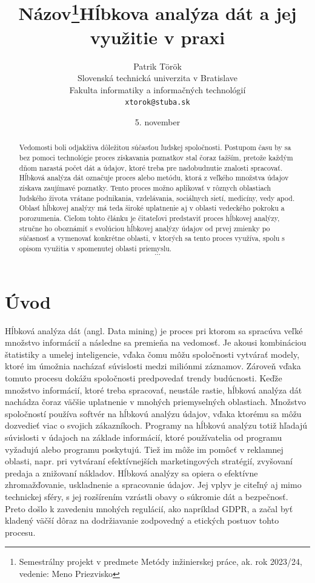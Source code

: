 \documentclass[10pt,twoside,slovak,a4paper]{article}
\title{Názov\thanks{Semestrálny projekt v predmete Metódy inžinierskej práce, ak. rok 2023/24, vedenie: Meno Priezvisko}} %
\title{Hĺbkova analýza dát a jej využitie v praxi}
\author{Patrik Török\\[2pt]
	{\small Slovenská technická univerzita v Bratislave}\\
	{\small Fakulta informatiky a informačných technológií}\\
	{\small \texttt{xtorok@stuba.sk}}
	}
\date{\small 5. november } %
\begin{document}
\maketitle

\begin{abstract}
Vedomosti boli odjakživa dôležitou súčasťou ľudskej spoločnosti. Postupom času by sa bez pomoci technológie proces získavania poznatkov stal čoraz ťažším, pretože každým dňom narastá počet dát a údajov, ktoré treba pre nadobudnutie znalosti spracovať. Hĺbková analýza dát označuje proces alebo metódu, ktorá z veľkého množstva údajov získava zaujímavé poznatky. Tento proces možno aplikovať v rôznych oblastiach ľudského života vrátane podnikania, vzdelávania, sociálnych sietí, medicíny, vedy apod. Oblasť hĺbkovej analýzy má teda široké uplatnenie aj v oblasti vedeckého pokroku a porozumenia. Cieľom tohto článku je čitateľovi predstaviť proces hĺbkovej analýzy, stručne ho oboznámiť s evolúciou hĺbkovej analýzy údajov od prvej zmienky po súčasnosť a vymenovať konkrétne oblasti, v ktorých sa tento proces využíva, spolu s opisom využitia v spomenutej oblasti priemyslu. 
$$ \cdots $$
\end{abstract}



\section{Úvod}
Hĺbková analýza dát (angl. Data mining) je proces pri ktorom sa spracúva veľké množstvo informácií a následne sa premieňa na vedomosť\cite{Iberdola}. Je akousi kombináciou štatistiky a umelej inteligencie, vďaka čomu môžu spoločnosti vytvárať modely, ktoré im úmožnia nacházať súvislosti medzi miliónmi záznamov. Zároveň vďaka tomuto procesu dokážu spoločnosti predpovedať trendy budúcnosti. Keďže množstvo informácií, ktoré treba spracovať, neustále rastie,  hĺbková analýza dát nachádza čoraz väčšie uplatnenie v mnohých priemyselných oblastiach. Množstvo spoločností používa softvér na hĺbkovú analýzu údajov, vďaka ktorému sa môžu dozvedieť viac o svojich zákazníkoch. Programy na hĺbkovú analýzu totiž hľadajú súvislosti v údajoch na základe informácií, ktoré používatelia od programu vyžadujú alebo programu poskytujú. Tiež im môže im pomôcť v reklamnej oblasti, napr. pri vytváraní efektívnejších marketingových stratégií, zvyšovaní predaja a znižovaní nákladov.\cite{Bidgoli:HTM} Hĺbková analýzy sa opiera o efektívne zhromažďovanie, uskladnenie a spracovanie údajov. Jej vplyv je citeľný aj mimo technickej sféry, s jej rozšírením vzrástli obavy o súkromie dát a bezpečnosť. Preto došlo k zavedeniu mnohých regulácií, ako napríklad GDPR, a začal byť kladený väčší dôraz na dodržiavanie zodpovedný a etických postuov tohto procesu.
\end{document}
